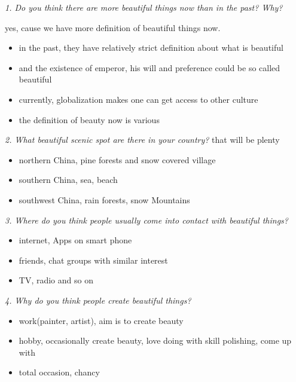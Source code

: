 \documentclass[conference]{IEEEtran}
\begin{document}
\textit{1. Do you think there are more beautiful things now than in the past? Why?}

yes, cause we have more definition of beautiful things now.
\begin{itemize}
    \item in the past, they have relatively strict definition about what is beautiful
    \item and the existence of emperor, his will and preference could be so called beautiful
    \item currently, globalization makes one can get access to other culture
    \item the definition of beauty now is various
\end{itemize}

\textit{2. What beautiful scenic spot are there in your country?}
that will be plenty
\begin{itemize}
    \item northern China, pine forests and snow covered village
    \item southern China, sea, beach
    \item southwest China, rain forests, snow Mountains
\end{itemize}

\textit{3. Where do you think people usually come into contact with beautiful things?}
\begin{itemize}
    \item internet, Apps on smart phone
    \item friends, chat groups with similar interest
    \item TV, radio and so on
\end{itemize}

\textit{4. Why do you think people create beautiful things?}
\begin{itemize}
    \item work(painter, artist), aim is to create beauty
    \item hobby, occasionally create beauty, love doing with skill polishing, come up with
    \item total occasion, chancy
\end{itemize}
\end{document}
